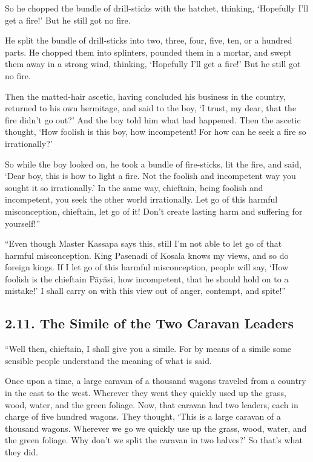 \documentclass[12pt,openany]{book}%
\begin{document}
So he chopped the bundle of drill-sticks with the hatchet, thinking, ‘Hopefully I’ll get a fire!’ But he still got no fire. 

He split the bundle of drill-sticks into two, three, four, five, ten, or a hundred parts. He chopped them into splinters, pounded them in a mortar, and swept them away in a strong wind, thinking, ‘Hopefully I’ll get a fire!’ But he still got no fire. 

Then the matted-hair ascetic, having concluded his business in the country, returned to his own hermitage, and said to the boy, ‘I trust, my dear, that the fire didn’t go out?’ And the boy told him what had happened. Then the ascetic thought, ‘How foolish is this boy, how incompetent! For how can he seek a fire so irrationally?’ 

So while the boy looked on, he took a bundle of fire-sticks, lit the fire, and said, ‘Dear boy, this is how to light a fire. Not the foolish and incompetent way you sought it so irrationally.’ In the same way, chieftain, being foolish and incompetent, you seek the other world irrationally. Let go of this harmful misconception, chieftain, let go of it! Don’t create lasting harm and suffering for yourself!” 

“Even though Master Kassapa says this, still I’m not able to let go of that harmful misconception. King Pasenadi of Kosala knows my views, and so do foreign kings. If I let go of this harmful misconception, people will say, ‘How foolish is the chieftain \textsanskrit{Pāyāsi}, how incompetent, that he should hold on to a mistake!’ I shall carry on with this view out of anger, contempt, and spite!” 

\subsection*{2.11. The Simile of the Two Caravan Leaders }

“Well then, chieftain, I shall give you a simile. For by means of a simile some sensible people understand the meaning of what is said. 

Once upon a time, a large caravan of a thousand wagons traveled from a country in the east to the west. Wherever they went they quickly used up the grass, wood, water, and the green foliage. Now, that caravan had two leaders, each in charge of five hundred wagons. They thought, ‘This is a large caravan of a thousand wagons. Wherever we go we quickly use up the grass, wood, water, and the green foliage. Why don’t we split the caravan in two halves?’ So that’s what they did. 
\end{document}
